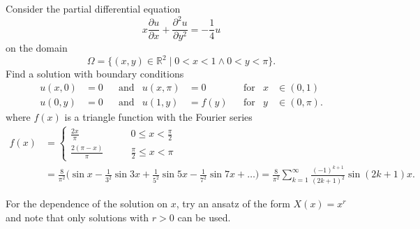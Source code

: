 Consider the partial differential equation
\begin{equation}
x \frac{\partial u}{\partial x}
+
\frac{\partial^2 u}{\partial y^2}
=
-\frac14
u
\label{40000023:eqn}
\end{equation}
on the domain 
\[
\Omega
=
\{
(x,y)\in\mathbb R^2
\;|\;
0<x<1\wedge 0<y<\pi
\}.
\]
Find a solution with boundary conditions
\[
\begin{aligned}
u(x,0) &= 0 &&\text{and}& u(x,\pi) &= 0 &&\text{for} &x&\in(0,1)
\\
u(0,y) &= 0 &&\text{and}& u(1,y) &= f(y) &&\text{for} &y&\in(0,\pi).
\end{aligned}
\]
where $f(x)$ is a triangle function with the Fourier series
\begin{align*}
f(x)
&=\begin{cases}
\displaystyle\frac{2x}{\pi}&\displaystyle\qquad 0\le x < \frac{\pi}2\\[10pt]
\displaystyle\frac{2(\pi - x)}{\pi}&\displaystyle\qquad \frac{\pi}2\le x < \pi
\end{cases}
\\
&=
\frac{8}{\pi^2}
\biggl(
\sin x - \frac1{3^2} \sin3x + \frac1{5^2}\sin5x - \frac1{7^2} \sin 7x + \dots
\biggr)
=
\frac{8}{\pi^2}
\sum_{k=1}^\infty \frac{(-1)^{k+1}}{(2k+1)^2} \sin (2k+1)x.
\end{align*}

\begin{hinweis}
For the dependence of the solution on $x$, try an ansatz of the form
$X(x)=x^r$ and note that only solutions with $r>0$ can be used.
\end{hinweis}

